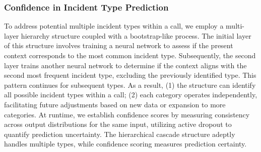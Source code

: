 
\subsubsection{Confidence in Incident Type Prediction}

To address potential multiple incident types within a call, we employ a multi-layer hierarchy structure coupled with a bootstrap-like process. The initial layer of this structure involves training a neural network to assess if the present context corresponds to the most common incident type. Subsequently, the second layer trains another neural network to determine if the context aligns with the second most frequent incident type, excluding the previously identified type. This pattern continues for subsequent types. As a result, (1) the structure can identify all possible incident types within a call; (2) each category operates independently, facilitating future adjustments based on new data or expansion to more categories. At runtime, we establish confidence scores by measuring consistency across output distributions for the same input, utilizing active dropout to quantify prediction uncertainty. The hierarchical cascade structure adeptly handles multiple types, while confidence scoring measures prediction certainty.


